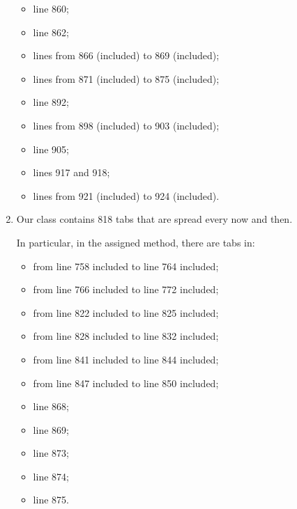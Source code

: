 \begin{enumerate}
\begin{itemize}
		    \item line 860;
		    \item line 862;
		    \item lines from 866 (included) to 869 (included);
		    \item lines from 871 (included) to 875 (included);
		    \item line 892;
		    \item lines from 898 (included) to 903 (included);
		    \item line 905;
		    \item lines 917 and 918;
		    \item lines from 921 (included) to 924 (included).
	    \end{itemize}
	\item Our class contains 818 tabs that are spread every now and then.
	
	In particular, in the assigned method, there are tabs in:
	\begin{itemize}
		\item from line 758 included to line 764 included;
		\item from line 766 included to line 772 included;
		\item from line 822 included to line 825 included;
		\item from line 828 included to line 832 included;
		\item from line 841 included to line 844 included;
		\item from line 847 included to line 850 included;
		\item line 868;
		\item line 869;
		\item line 873;
		\item line 874;
		\item line 875.
	\end{itemize}
\end{enumerate}
